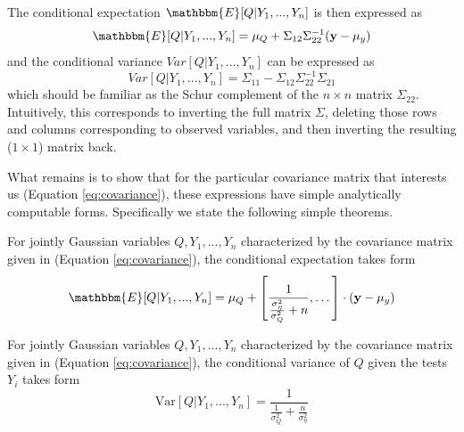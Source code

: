 The conditional expectation $\mathbbm{E}[Q|Y_1,...,Y_n]$
is then expressed as 
\begin{equation} 
\label{eq:mean}
\mathbbm{E}[Q|Y_1,...,Y_n] =
\mu_Q + \Sigma_{12} \Sigma_{22}^{-1} (\mathbf{y}-\mu_y)
\end{equation}
and the conditional variance $Var[Q|Y_1,...,Y_n]$
can be expressed as
\begin{equation}
Var[Q|Y_1,...,Y_n] = \Sigma_{11}
- \Sigma_{12} \Sigma_{22}^{-1} \Sigma_{21}
\end{equation}
which should be familiar as the Schur complement
of the $n \times n$ matrix $\Sigma_{22}$.
Intuitively, this corresponds to inverting the full matrix $\Sigma$, deleting those rows and columns corresponding to observed variables, and then inverting the resulting ($1 \times 1$) matrix back.



What remains is to show that for the particular 
covariance matrix that interests us (Equation \ref{eq:covariance}), these expressions have simple analytically computable forms. 
Specifically we state the following simple theorems.

\begin{theorem}
\label{thm:expectation}
For jointly Gaussian variables $Q, Y_1, ..., Y_n$
characterized by the covariance matrix given in (Equation \ref{eq:covariance}),
the conditional expectation takes form \begin{equation}
\mathbbm{E}[Q|Y_1,...,Y_n]
= \mu_Q + \left[\frac{1}{\frac{\sigma_\eta^2}{\sigma_Q^2} + n}, \dots \right] \cdot (\mathbf{y} - \mathbf{\mu}_y)
\end{equation}
\end{theorem}


\begin{theorem}\label{thm:variance}
For jointly Gaussian variables $Q, Y_1, ..., Y_n$
characterized by the covariance matrix given in (Equation \ref{eq:covariance}),
the conditional variance of $Q$ given the tests $Y_i$ takes form \begin{equation}
\text{Var}[Q|Y_1,...,Y_n] =
\frac{1}{
\frac{1}{\sigma_Q^2} + \frac{n}{\sigma_\eta^2}}
\end{equation}
\end{theorem}
